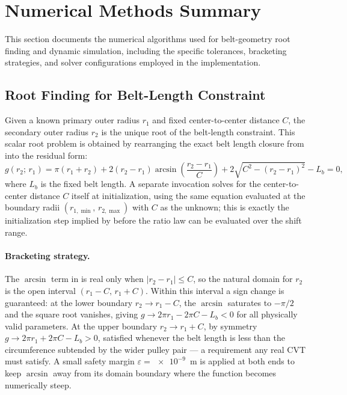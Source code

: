 \documentclass[11pt]{article}
\numberwithin{equation}{section}
\begin{document}
\section{Numerical Methods Summary}\label{sec:appendix-numerics}

This section documents the numerical algorithms used for belt-geometry root
finding and dynamic simulation, including the specific tolerances, bracketing
strategies, and solver configurations employed in the implementation.

\subsection{Root Finding for Belt-Length Constraint}

Given a known primary outer radius $r_1$ and fixed center-to-center distance
$C$, the secondary outer radius $r_2$ is the unique root of the belt-length
constraint. This scalar root problem is obtained by rearranging the exact belt
length closure from  into the residual form:
\begin{equation}
g(r_2;\,r_1)
=
\pi(r_1+r_2)
+ 2(r_2-r_1)\arcsin\!\left(\frac{r_2-r_1}{C}\right)
+ 2\sqrt{C^2-(r_2-r_1)^2}
- L_b
= 0,
\label{eq:belt_constraint_g}
\end{equation}
where $L_b$ is the fixed belt length. A separate invocation solves for the
center-to-center distance $C$ itself at initialization, using the same equation
evaluated at the boundary radii $(r_{1,\min},\, r_{2,\max})$ with $C$ as the
unknown; this is exactly the initialization step implied by
 before the ratio law  can be
evaluated over the shift range.

\paragraph{Bracketing strategy.}

The $\arcsin$ term in  is real only when
$|r_2 - r_1| \le C$, so the natural domain for $r_2$ is the open interval
$(r_1 - C,\, r_1 + C)$. Within this interval a sign change is guaranteed:
at the lower boundary $r_2 \to r_1 - C$, the $\arcsin$ saturates to $-\pi/2$
and the square root vanishes, giving
$g \to 2\pi r_1 - 2\pi C - L_b < 0$ for all physically valid parameters.
At the upper boundary $r_2 \to r_1 + C$, by symmetry
$g \to 2\pi r_1 + 2\pi C - L_b > 0$, satisfied whenever the belt length is
less than the circumference subtended by the wider pulley pair --- a
requirement any real CVT must satisfy. A small safety margin
$\varepsilon = \num{e-9}$~m is applied at both ends to keep $\arcsin$ away
from its domain boundary where the function becomes numerically steep.
\end{document}
